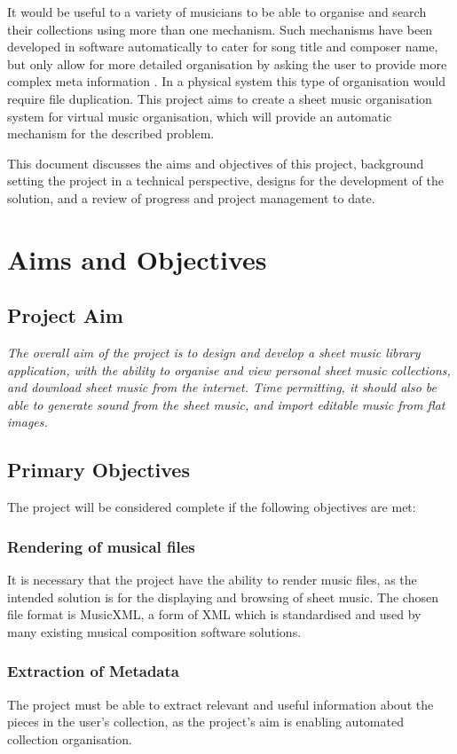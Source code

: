 It would be useful to a variety of musicians to be able to organise and search their collections using more than one mechanism. Such mechanisms have been developed in software automatically to cater for song title and composer name, but only allow for more detailed organisation by asking the user to provide more complex meta information \parencite{calypso}. In a physical system this type of organisation would require file duplication. This project aims to create a sheet music organisation system for virtual music organisation, which will provide an automatic mechanism for the described problem.

This document discusses the aims and objectives of this project, background setting the project in a technical perspective, designs for the development of the solution, and a review of progress and project management to date. 
\pagebreak
\section{Aims and Objectives}
\subsection{Project Aim}
\begin{center}
\textit{The overall aim of the project is to design and develop a sheet music library application, with the ability to organise and view personal sheet music collections, and download sheet music from the internet. Time permitting, it should also be able to generate sound from the sheet music, and import editable music from flat images.}
\end{center}
\subsection{Primary Objectives}
The project will be considered complete if the following objectives are met:
\subsubsection{Rendering of musical files}
It is necessary that the project have the ability to render music files, as the intended solution is for the displaying and browsing of sheet music. The chosen file format is MusicXML, a form of XML which is standardised and used by many existing musical composition software solutions.
\subsubsection{Extraction of Metadata}
The project must be able to extract relevant and useful information about the pieces in the user's collection, as the project's aim is enabling automated collection organisation. 
